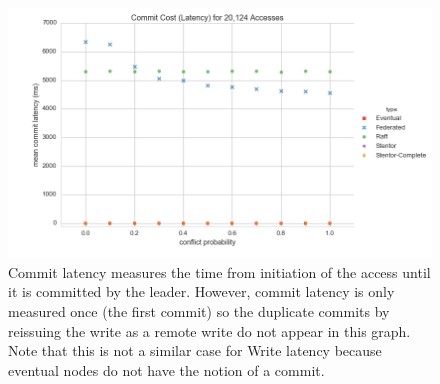 \documentclass[11pt,letterpaper]{article}
\begin{document}
\begin{figure}[!h]
    \centering
        \includegraphics[width=\textwidth]{figures/commit_latency.png}
        \caption{\textsf{Commit latency measures the time from initiation of the access until it is committed by the leader. However, commit latency is only measured once (the first commit) so the duplicate commits by reissuing the write as a remote write do not appear in this graph. Note that this is not a similar case for Write latency because eventual nodes do not have the notion of a commit.}}
        \label{fig:commit_latency}
\end{figure}
\end{document}
